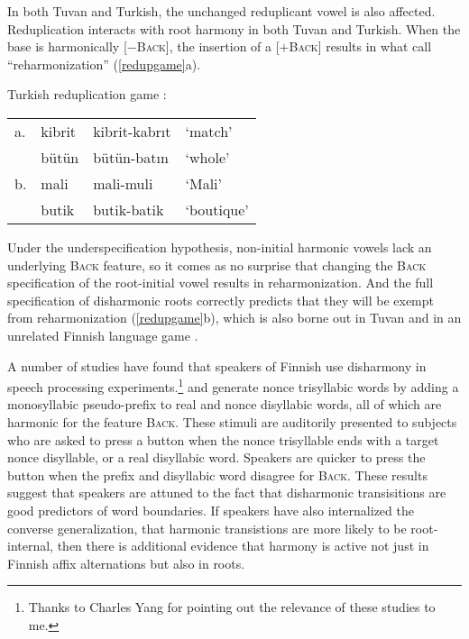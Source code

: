 In both Tuvan and Turkish, the unchanged reduplicant vowel is also affected. Reduplication interacts with root harmony in both Tuvan and Turkish. When the base is harmonically [$-$\textsc{Back}], the insertion of a [$+$\textsc{Back}] results in what \citeauthor{Harrison2001} call ``reharmonization'' (\ref{redupgame}a).

\begin{example}
\label{redupgame}
Turkish reduplication game \citep[][231]{Harrison2001}:

\vspace{0.5\baselineskip}
\begin{tabular}{l l l l}
a. & kibrit & kibrit-kabrıt & `match'    \\
   & bütün  & bütün-batın   & `whole'    \\
b. & mali   & mali-muli     & `Mali'     \\
   & butik  & butik-batik   & `boutique' \\
\end{tabular}
\end{example}

\noindent
Under the underspecification hypothesis, non-initial harmonic vowels lack an underlying \textsc{Back} feature, so it comes as no surprise that changing the \textsc{Back} specification of the root-initial vowel results in reharmonization. And the full specification of disharmonic roots correctly predicts that they will be exempt from reharmonization (\ref{redupgame}b), which is also borne out in Tuvan and in an unrelated Finnish language game \citep{Campbell1986}.

A number of studies have found that speakers of Finnish use disharmony in speech processing experiments.\footnote{Thanks to Charles Yang for pointing out the relevance of these studies to me.} \citet{Suomi1997} and \citet{Vroomen1998} generate nonce trisyllabic words by adding a monosyllabic pseudo-prefix to real and nonce disyllabic words, all of which are harmonic for the feature \textsc{Back}. These stimuli are auditorily presented to subjects who are asked to press a button when the nonce trisyllable ends with a target nonce disyllable, or a real disyllabic word. Speakers are quicker to press the button when the prefix and disyllabic word disagree for \textsc{Back}. These results suggest that speakers are attuned to the fact that disharmonic transisitions are good predictors of word boundaries. If speakers have also internalized the converse generalization, that harmonic transistions are more likely to be root-internal, then there is additional evidence that harmony is active not just in Finnish affix alternations but also in roots. 

